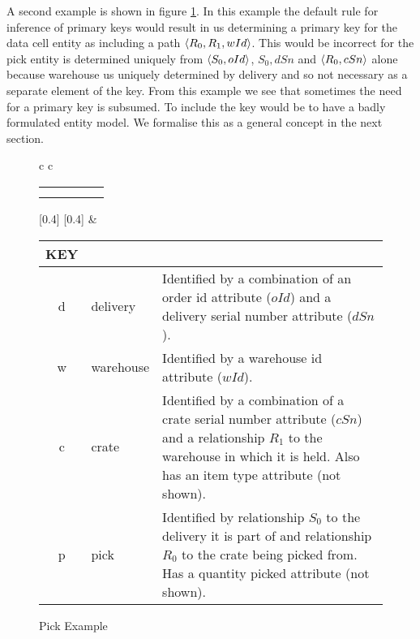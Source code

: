 \documentclass[10pt,a4paper]{article}
\begin{document}
A second example is shown in figure \ref{pickexample}. In this example the default rule for inference of primary keys would result in us determining
a primary key for the data cell entity as including a path 
$\langle R_0,R_1,wId\rangle$. This would be incorrect for the pick entity 
is determined uniquely from 
$\langle S_0,oId\rangle$, $S_0,dSn$ and $\langle R_0,cSn\rangle$ alone because 
warehouse us uniquely determined by delivery and so not necessary as a separate 
element of the key. From this example we see that sometimes
the need for a primary key is subsumed. To include the key would be to 
have a badly formulated entity model. We formalise this as a general concept in the next section.
\begin{figure} [h]
\begin{center}
\begin{tabular}{c c}
\begin{tabular}{cp{0.75cm}cp{0.75cm}c}
   \Rnode{d}{d}    & & \Rnode{w}{w}   & & \Rnode{v}{v}\\[1.2cm]     
	 \Rnode{p}{p}  & & \Rnode{c}{c} & &               
\end{tabular}
[0.4]
\idcomp
{}
[0.4]
\idcomp
{} 
\idcomp
{} 
\idcomp
{}
\idcomp
{}
\idcomp
{}
\idcomp
& \footnotesize
\begin{tabular}{c p{1.5cm} p{4cm}}
KEY && \\
\hline
d & delivery & Identified by a combination of an order id attribute ($oId$) and a
delivery serial number  attribute ($dSn$). \\
w & warehouse & Identified by a warehouse id attribute ($wId$). \\
c & crate & Identified by a combination of a crate serial number attribute ($cSn$) and a relationship $R_1$ to the warehouse in which it is held.
             Also has an item type attribute (not shown).\\
p & pick & Identified by relationship $S_0$ to the delivery  it is part of and relationship $R_0$ to the crate being picked from. Has a quantity picked attribute (not shown). \\
\end{tabular} 
\end{tabular}
\end{center}
\caption{Pick Example}
\label{pickexample}
\end{figure}
\end{document}
